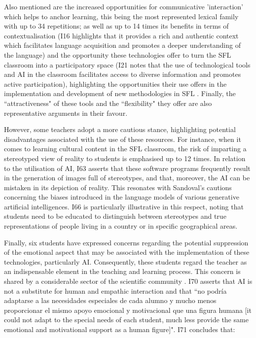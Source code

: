 \documentclass[english]{textolivre}
\begin{document}
Also mentioned are the increased opportunities for communicative 'interaction' which helps to anchor learning, this being the most represented lexical family with up to 34 repetitions; as well as up to 14 times its benefits in terms of contextualisation (I16 highlights that it provides a rich and authentic context which facilitates language acquisition and promotes a deeper understanding of the language) and the opportunity these technologies offer to turn the SFL classroom into a participatory space (I21 notes that the use of technological tools and AI in the classroom facilitates access to diverse information and promotes active participation), highlighting the opportunities their use offers in the implementation and development of new methodologies in SFL \cite{ayala2023}. Finally, the ``attractiveness" of these tools and the ``flexibility" \cite{moreno-padilla2019, roman2024} they offer are also representative arguments in their favour.

However, some teachers adopt a more cautious stance, highlighting potential disadvantages associated with the use of these resources. For instance, when it comes to learning cultural content in the SFL classroom, the risk of imparting a stereotyped view of reality to students is emphasised up to 12 times. In relation to the utilisation of AI, I63 asserts that these software programs frequently result in the generation of images full of stereotypes, and that, moreover, the AI can be mistaken in its depiction of reality. This resonates with Sandoval's \citeyear{sandoval2024} cautions concerning the biases introduced in the language models of various generative artificial intelligences. I66 is particularly illustrative in this respect, noting that students need to be educated to distinguish between stereotypes and true representations of people living in a country or in specific geographical areas.

Finally, six students have expressed concerns regarding the potential suppression of the emotional aspect that may be associated with the implementation of these technologies, particularly AI. Consequently, these students regard the teacher as an indispensable element in the teaching and learning process. This concern is shared by a considerable sector of the scientific community \cite{martin-marchante2022, canales2024, rodriguez2024, sandoval2024}. I70 asserts that AI is not a substitute for human and empathic interaction and that ``no podría adaptarse a las necesidades especiales de cada alumno y mucho menos proporcionar el mismo apoyo emocional y motivacional que una figura humana [it could not adapt to the special needs of each student, much less provide the same emotional and motivational support as a human figure]". I71 concludes that:
\end{document}
